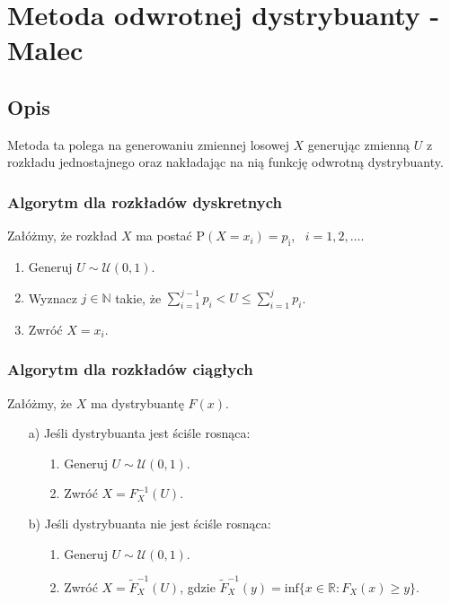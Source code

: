 \documentclass[12pt]{mwrep}
\begin{document}
	
	\section{Metoda odwrotnej dystrybuanty - Malec}
	
	\subsection{Opis}
	\noindent Metoda ta polega na generowaniu zmiennej losowej $X$ generując zmienną $U$ z rozkładu jednostajnego oraz nakładając na nią funkcję odwrotną dystrybuanty.
	\subsubsection{Algorytm dla rozkładów dyskretnych}
	\noindent Załóżmy, że rozkład $X$ ma postać $\mathrm{P}(X = x_i) = p_\mathrm{i}$, \ $i = 1, 2,\dots $.
	\begin{enumerate}[leftmargin=10mm]
		\item Generuj $U \sim \mathcal{U}(0, 1)$.
		\item Wyznacz $j \in \mathbb{N} $ takie, że $ \sum\limits_{i=1}^{j-1} p_i < U \leqslant \sum\limits_{i=1}^{j} p_i $.
		\item Zwróć $ X = x_i $.
	\end{enumerate}
	\subsubsection{Algorytm dla rozkładów ciągłych}
	\noindent Załóżmy, że $X$ ma dystrybuantę $F(x)$.
	\begin{enumerate}[leftmargin=10mm]
		\item[a)] Jeśli dystrybuanta jest ściśle rosnąca:
		\begin{enumerate}
			\item[1.] Generuj $U \sim \mathcal{U}(0, 1)$.
			\item[2.] Zwróć $ X = F_X^{-1}(U) $.
		\end{enumerate}
		\item[b)] Jeśli dystrybuanta nie jest ściśle rosnąca:
		\begin{enumerate}
			\item[1.] Generuj $U \sim \mathcal{U}(0, 1)$.
			\item[2.] Zwróć $ X = \widetilde{F}_X^{-1}(U) $, gdzie $ \widetilde{F}_X^{-1}(y) = \mathrm{inf}\{x \in \mathbb{R}: F_X(x) \geqslant y\} $.
		\end{enumerate}
	\end{enumerate}
\end{document}
